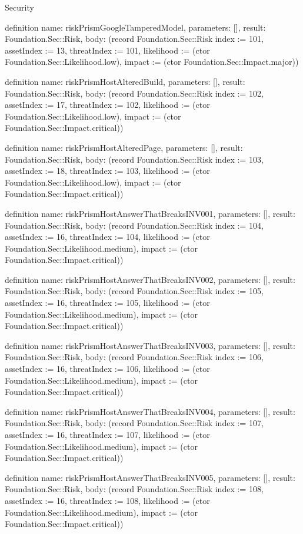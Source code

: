 \begin{lexlean}{Security}
\begin{semanticmodule}
definition{
  name: riskPrismGoogleTamperedModel,
  parameters: [],
  result: Foundation.Sec::Risk,
  body: (record Foundation.Sec::Risk {index := 101, assetIndex := 13, threatIndex := 101, likelihood := (ctor Foundation.Sec::Likelihood.low), impact := (ctor Foundation.Sec::Impact.major)})
}

definition{
  name: riskPrismHostAlteredBuild,
  parameters: [],
  result: Foundation.Sec::Risk,
  body: (record Foundation.Sec::Risk {index := 102, assetIndex := 17, threatIndex := 102, likelihood := (ctor Foundation.Sec::Likelihood.low), impact := (ctor Foundation.Sec::Impact.critical)})
}

definition{
  name: riskPrismHostAlteredPage,
  parameters: [],
  result: Foundation.Sec::Risk,
  body: (record Foundation.Sec::Risk {index := 103, assetIndex := 18, threatIndex := 103, likelihood := (ctor Foundation.Sec::Likelihood.low), impact := (ctor Foundation.Sec::Impact.critical)})
}

definition{
  name: riskPrismHostAnswerThatBreaksINV001,
  parameters: [],
  result: Foundation.Sec::Risk,
  body: (record Foundation.Sec::Risk {index := 104, assetIndex := 16, threatIndex := 104, likelihood := (ctor Foundation.Sec::Likelihood.medium), impact := (ctor Foundation.Sec::Impact.critical)})
}

definition{
  name: riskPrismHostAnswerThatBreaksINV002,
  parameters: [],
  result: Foundation.Sec::Risk,
  body: (record Foundation.Sec::Risk {index := 105, assetIndex := 16, threatIndex := 105, likelihood := (ctor Foundation.Sec::Likelihood.medium), impact := (ctor Foundation.Sec::Impact.critical)})
}

definition{
  name: riskPrismHostAnswerThatBreaksINV003,
  parameters: [],
  result: Foundation.Sec::Risk,
  body: (record Foundation.Sec::Risk {index := 106, assetIndex := 16, threatIndex := 106, likelihood := (ctor Foundation.Sec::Likelihood.medium), impact := (ctor Foundation.Sec::Impact.critical)})
}

definition{
  name: riskPrismHostAnswerThatBreaksINV004,
  parameters: [],
  result: Foundation.Sec::Risk,
  body: (record Foundation.Sec::Risk {index := 107, assetIndex := 16, threatIndex := 107, likelihood := (ctor Foundation.Sec::Likelihood.medium), impact := (ctor Foundation.Sec::Impact.critical)})
}

definition{
  name: riskPrismHostAnswerThatBreaksINV005,
  parameters: [],
  result: Foundation.Sec::Risk,
  body: (record Foundation.Sec::Risk {index := 108, assetIndex := 16, threatIndex := 108, likelihood := (ctor Foundation.Sec::Likelihood.medium), impact := (ctor Foundation.Sec::Impact.critical)})
}


\end{semanticmodule}
\end{lexlean}
